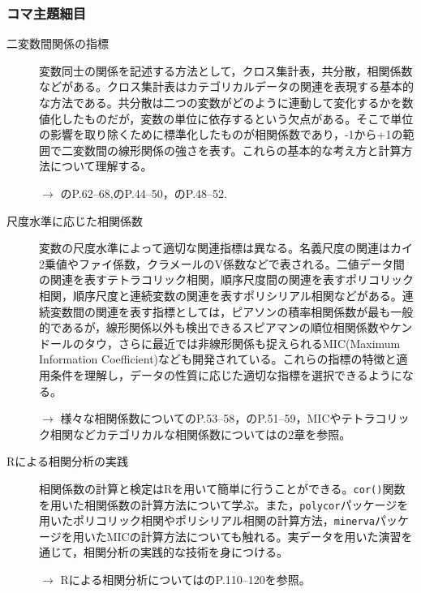 \subsubsection{コマ主題細目}
\begin{description}
	\item[二変数間関係の指標] 変数同士の関係を記述する方法として，クロス集計表，共分散，相関係数などがある。クロス集計表はカテゴリカルデータの関連を表現する基本的な方法である。共分散は二つの変数がどのように連動して変化するかを数値化したものだが，変数の単位に依存するという欠点がある。そこで単位の影響を取り除くために標準化したものが相関係数であり，-1から+1の範囲で二変数間の線形関係の強さを表す。これらの基本的な考え方と計算方法について理解する。
	      \begin{flushright}
		      $\to$ \textcite{Yamauchi201001}のP.62--68,\textcite{Yamada2004}のP.44--50，\textcite{Kawabata201408}のP.48--52.
	      \end{flushright}

	\item[尺度水準に応じた相関係数] 変数の尺度水準によって適切な関連指標は異なる。名義尺度の関連はカイ2乗値やファイ係数，クラメールのV係数などで表される。二値データ間の関連を表すテトラコリック相関，順序尺度間の関連を表すポリコリック相関，順序尺度と連続変数の関連を表すポリシリアル相関などがある。連続変数間の関連を表す指標としては，ピアソンの積率相関係数が最も一般的であるが，線形関係以外も検出できるスピアマンの順位相関係数やケンドールのタウ，さらに最近では非線形関係も捉えられるMIC(Maximum Information Coefficient)なども開発されている。これらの指標の特徴と適用条件を理解し，データの性質に応じた適切な指標を選択できるようになる。
	      \begin{flushright}
		      $\to$ 様々な相関係数について\textcite{Kawabata201408}のP.53--58，\textcite{Yamada2004}のP.51--59，MICやテトラコリック相関などカテゴリカルな相関係数については\textcite{TDE2022}の2章を参照。
	      \end{flushright}

	\item[Rによる相関分析の実践] 相関係数の計算と検定はRを用いて簡単に行うことができる。\texttt{cor()}関数を用いた相関係数の計算方法について学ぶ。また，\texttt{polycor}パッケージを用いたポリコリック相関やポリシリアル相関の計算方法，\texttt{minerva}パッケージを用いたMICの計算方法についても触れる。実データを用いた演習を通じて，相関分析の実践的な技術を身につける。
	      \begin{flushright}
		      $\to$ Rによる相関分析については\textcite{kosugi2019}のP.110--120を参照。
	      \end{flushright}


\end{description}
